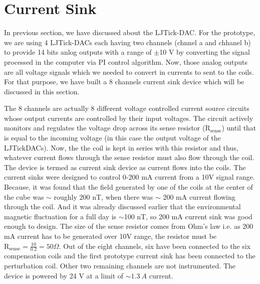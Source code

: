 \section{Current Sink}\label{sec:sink}


In previous section, we have discussed about the LJTick-DAC. For the prototype, we are using 4 LJTick-DACs each having two channels (chnnel a and chhanel b) to provide 14 bits anlog outputs with a range of $\pm$10 V by converting the signal processed in the computer via PI control algorithm. Now, those analog outputs are all voltage signals which we needed to convert in currents to sent to the coils. For that purpose, we have built a 8 channels current sink device which will be discussed in this section. 


The 8 channels are actually 8 different voltage controlled current source circuits whose output currents are controlled by their input voltages. The circuit actively monitors and regulates the voltage drop across its sense resistor ($\mathrm{R_{sense}}$) until that is equal to the incoming voltage (in this case the output voltage of the LJTickDACs). Now, the the coil is kept in series with this resistor and thus, whatever current flows through the sense resistor must also flow through the coil. The device is termed as current sink device as current flows into the coils. The current sinks were designed to control 0-200 mA current from a 10V signal range. Because, it was found that the field generated by one of the coils at the center of the cube was $\sim$ roughly 200 nT, when there was $\sim$ 200 mA current flowing through the coil. And it was already discussed earlier that the environmental magnetic fluctuation for a full day is $\sim$100 nT, so 200 mA current sink was good enough to design. The size of the sense resistor comes from Ohm's law i.e. as 200 mA current has to be generated over 10V range, the resistor must be $\mathrm{R_{sense}}=\frac{10}{0.2}=50 \Omega$. Out of the eight channels, six have been connected to the six compensation coils and the first prototype current sink has been connected to the perturbation coil. Other two remaining channels are not instrumented. The device is powered by 24 V at a limit of $\sim 1.3 \: A$ current. 

